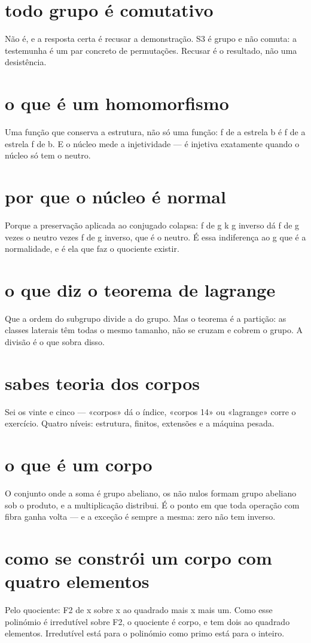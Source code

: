 \documentclass[11pt,a4paper]{article}
\begin{document}
\section{todo grupo é comutativo}
Não é, e a resposta certa é recusar a demonstração. S3 é grupo e não comuta: a
testemunha é um par concreto de permutações. Recusar é o resultado, não uma desistência.

\section{o que é um homomorfismo}
Uma função que conserva a estrutura, não só uma função: f de a estrela b é f de a estrela
f de b. E o núcleo mede a injetividade --- é injetiva exatamente quando o núcleo só tem o
neutro.

\section{por que o núcleo é normal}
Porque a preservação aplicada ao conjugado colapsa: f de g k g inverso dá f de g vezes o
neutro vezes f de g inverso, que é o neutro. É essa indiferença ao g que é a normalidade,
e é ela que faz o quociente existir.

\section{o que diz o teorema de lagrange}
Que a ordem do subgrupo divide a do grupo. Mas o teorema é a partição: as classes
laterais têm todas o mesmo tamanho, não se cruzam e cobrem o grupo. A divisão é o que
sobra disso.

\section{sabes teoria dos corpos}
Sei os vinte e cinco --- «corpos» dá o índice, «corpos 14» ou «lagrange» corre o
exercício. Quatro níveis: estrutura, finitos, extensões e a máquina pesada.

\section{o que é um corpo}
O conjunto onde a soma é grupo abeliano, os não nulos formam grupo abeliano sob o
produto, e a multiplicação distribui. É o ponto em que toda operação com fibra ganha
volta --- e a exceção é sempre a mesma: zero não tem inverso.

\section{como se constrói um corpo com quatro elementos}
Pelo quociente: F2 de x sobre x ao quadrado mais x mais um. Como esse polinómio é
irredutível sobre F2, o quociente é corpo, e tem dois ao quadrado elementos.
Irredutível está para o polinómio como primo está para o inteiro.
\end{document}
